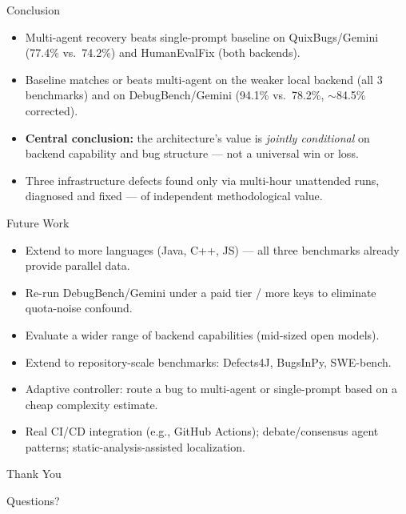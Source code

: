 \documentclass[aspectratio=169]{beamer}
\begin{document}
\begin{frame}{Conclusion}
\begin{itemize}
    \item Multi-agent recovery beats single-prompt baseline on QuixBugs/Gemini (77.4\% vs.\ 74.2\%) and HumanEvalFix (both backends).
    \item Baseline matches or beats multi-agent on the weaker local backend (all 3 benchmarks) and on DebugBench/Gemini (94.1\% vs.\ 78.2\%, $\sim$84.5\% corrected).
    \item \textbf{Central conclusion:} the architecture's value is \emph{jointly conditional} on backend capability and bug structure --- not a universal win or loss.
    \item Three infrastructure defects found only via multi-hour unattended runs, diagnosed and fixed --- of independent methodological value.
\end{itemize}
\end{frame}

\begin{frame}{Future Work}
\begin{itemize}
    \item Extend to more languages (Java, C++, JS) --- all three benchmarks already provide parallel data.
    \item Re-run DebugBench/Gemini under a paid tier / more keys to eliminate quota-noise confound.
    \item Evaluate a wider range of backend capabilities (mid-sized open models).
    \item Extend to repository-scale benchmarks: Defects4J, BugsInPy, SWE-bench.
    \item Adaptive controller: route a bug to multi-agent or single-prompt based on a cheap complexity estimate.
    \item Real CI/CD integration (e.g., GitHub Actions); debate/consensus agent patterns; static-analysis-assisted localization.
\end{itemize}
\end{frame}

\begin{frame}
\centering
\Huge Thank You
\vspace{12pt}

\normalsize Questions?
\end{frame}
\end{document}

